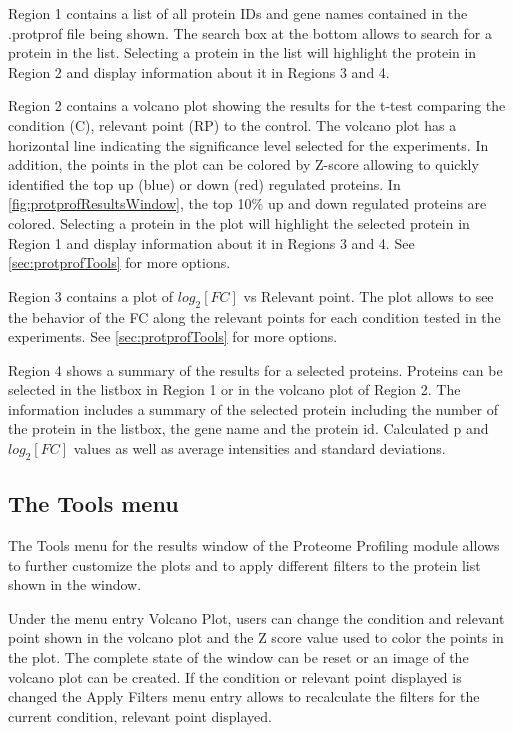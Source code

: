 Region \num{1} contains a list of all protein IDs and gene names contained in the .protprof file being shown. The search box at the bottom allows to search for a protein in the list. Selecting a protein in the list will highlight the protein in Region \num{2} and display information about it in Regions \num{3} and \num{4}.

Region \num{2} contains a volcano plot showing the results for the t-test comparing the condition (C), relevant point (RP) to the control. The volcano plot has a horizontal line indicating the significance level selected for the experiments. In addition, the points in the plot can be colored by Z-score allowing to quickly identified the top up (blue) or down (red) regulated proteins. In \autoref{fig:protprofResultsWindow}, the top \num{10}{\%} up and down regulated proteins are colored. Selecting a protein in the plot will highlight the selected protein in Region \num{1} and display information about it in Regions \num{3} and \num{4}. See \autoref{sec:protprofTools} for more options.

Region \num{3} contains a plot of $log_2[FC]$ vs Relevant point. The plot allows to see the behavior of the FC along the relevant points for each condition tested in the experiments. See \autoref{sec:protprofTools} for more options.

Region \num{4} shows a summary of the results for a selected proteins. Proteins can be selected in the listbox in Region \num{1} or in the volcano plot of Region \num{2}. The information includes a summary of the selected protein including the number of the protein in the listbox, the gene name and the protein id. Calculated p and $log_2[FC]$ values as well as average intensities and standard deviations.

\subsection{The Tools menu}
\label{sec:protprofTools}

The Tools menu for the results window of the Proteome Profiling module allows to further customize the plots and to apply different filters to the protein list shown in the window.

Under the menu entry Volcano Plot, users can change the condition and relevant point shown in the volcano plot and the Z score value used to color the points in the plot. The complete state of the window can be reset or an image of the volcano plot can be created. If the condition or relevant point displayed is changed the Apply Filters menu entry allows to recalculate the filters for the current condition, relevant point displayed.

